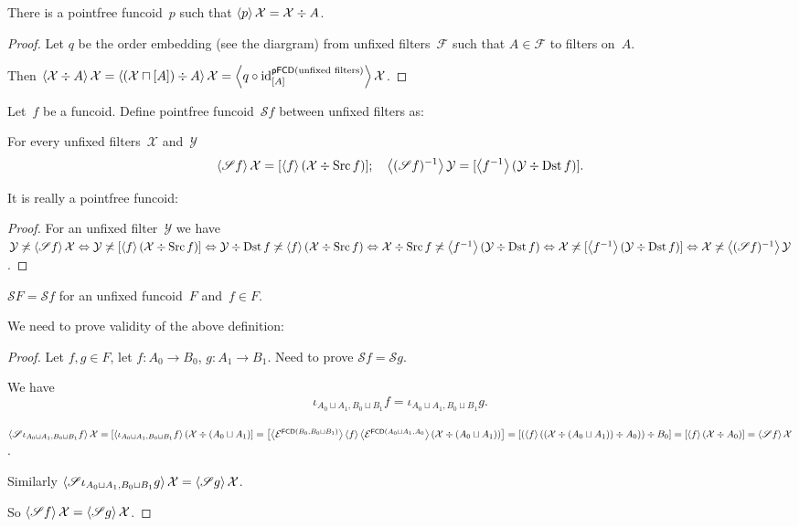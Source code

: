 \begin{cor}
There is a pointfree funcoid~$p$ such that
$\left\langle p\right\rangle\mathcal{X}=\mathcal{X}\div A$.
\end{cor}

\begin{proof}
Let $q$ be the order embedding (see the diargram) from
unfixed filters~$\mathcal{F}$ such that $A\in\mathcal{F}$
to filters on~$A$.

Then
$\left\langle \mathcal{X}\div A\right\rangle\mathcal{X}=
\left\langle (\mathcal{X}\sqcap[A])\div A\right\rangle\mathcal{X}=
\left\langle q\circ\operatorname{id}^{\mathsf{pFCD}(\text{unfixed filters})}_{[A]}\right\rangle\mathcal{X}$.
\end{proof}

Let~$f$ be a funcoid. Define pointfree
funcoid~$\mathscr{S}f$ between unfixed filters as:

\begin{defn}
For every unfixed filters~$\mathcal{X}$
and~$\mathcal{Y}$
\[
\left\langle \mathscr{S}f\right\rangle\mathcal{X}=
[\left\langle f\right\rangle(\mathcal{X}\div\operatorname{Src} f)];\quad
\left\langle (\mathscr{S}f)^{-1}\right\rangle\mathcal{Y}=
[\left\langle f^{-1}\right\rangle(\mathcal{Y}\div\operatorname{Dst} f)].
\]
\end{defn}

It is really a pointfree funcoid:

\begin{proof}
For an unfixed filter~$\mathcal{Y}$ we have
$\mathcal{Y}\not\asymp\left\langle \mathscr{S}f\right\rangle\mathcal{X}
\Leftrightarrow
\mathcal{Y}\not\asymp[\left\langle f\right\rangle(\mathcal{X}\div\operatorname{Src} f)]
\Leftrightarrow
\mathcal{Y}\div\operatorname{Dst} f\not\asymp\left\langle f\right\rangle(\mathcal{X}\div\operatorname{Src} f)
\Leftrightarrow
\mathcal{X}\div\operatorname{Src} f\not\asymp\left\langle f^{-1}\right\rangle(\mathcal{Y}\div\operatorname{Dst} f)
\Leftrightarrow
\mathcal{X}\not\asymp[\left\langle f^{-1}\right\rangle(\mathcal{Y}\div\operatorname{Dst} f)]
\Leftrightarrow
\mathcal{X}\not\asymp\left\langle (\mathscr{S}f)^{-1}\right\rangle\mathcal{Y}$.
\end{proof}

\begin{defn}
$\mathscr{S}F=\mathscr{S}f$ for an unfixed funcoid~$F$
and~$f\in F$.
\end{defn}

We need to prove validity of the above definition:

\begin{proof}
Let $f,g\in F$, let $f:A_0\to B_0$, $g:A_1\to B_1$.
Need to prove $\mathscr{S}f=\mathscr{S}g$.

We have
\[\iota_{A_0\sqcup A_1,B_0\sqcup B_1}f=\iota_{A_0\sqcup A_1,B_0\sqcup B_1}g.\]

$\left\langle \mathscr{S}\iota_{A_0\sqcup A_1,B_0\sqcup B_1}f\right\rangle\mathcal{X}=
[\left\langle \iota_{A_0\sqcup A_1,B_0\sqcup B_1}f\right\rangle(\mathcal{X}\div(A_0\sqcup A_1)]=
\left[\left\langle \mathcal{E}^{\mathsf{FCD}(B_0,B_0\sqcup B_1)}\right\rangle\left\langle f\right\rangle\left\langle \mathcal{E}^{\mathsf{FCD}(A_0\sqcup A_1,A_0}\right\rangle(\mathcal{X}\div(A_0\sqcup A_1))\right]=
[(\left\langle f\right\rangle((\mathcal{X}\div(A_0\sqcup A_1))\div A_0))
\div B_0]=
[\left\langle f\right\rangle(\mathcal{X}\div A_0)]=
\left\langle \mathscr{S}f\right\rangle\mathcal{X}$.

Similarly
$\left\langle \mathscr{S}\iota_{A_0\sqcup A_1,B_0\sqcup B_1}g\right\rangle\mathcal{X}=
\left\langle \mathscr{S}g\right\rangle\mathcal{X}$.

So $\left\langle \mathscr{S}f\right\rangle\mathcal{X}=
\left\langle \mathscr{S}g\right\rangle\mathcal{X}$.
\end{proof}

